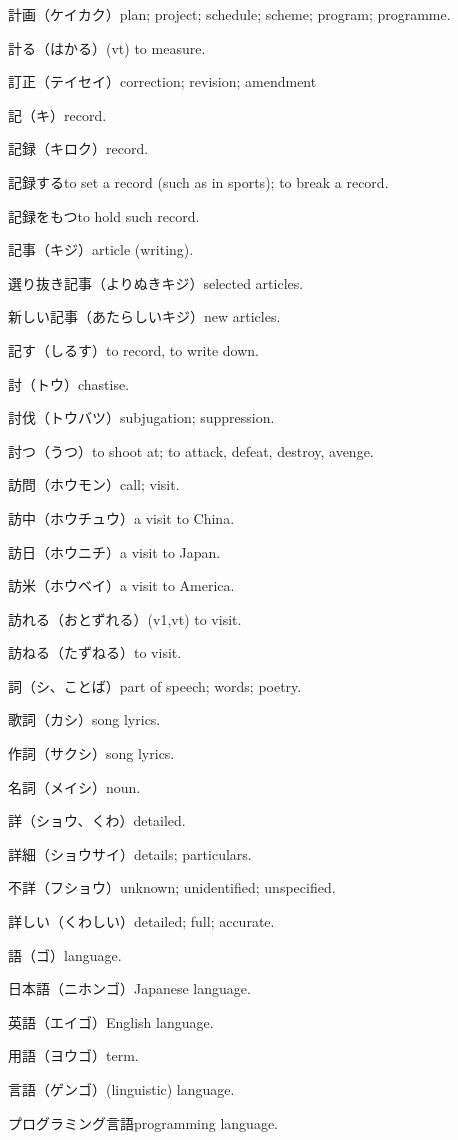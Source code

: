 計画（ケイカク）plan; project; schedule; scheme; program; programme.

計る（はかる）(vt) to measure.

訂正（テイセイ）correction; revision; amendment

記（キ）record.

記録（キロク）record.

記録するto set a record (such as in sports); to break a record.

記録をもつto hold such record.

記事（キジ）article (writing).

選り抜き記事（よりぬきキジ）selected articles.

新しい記事（あたらしいキジ）new articles.

記す（しるす）to record, to write down.

討（トウ）chastise.

討伐（トウバツ）subjugation; suppression.

討つ（うつ）to shoot at; to attack, defeat, destroy, avenge.

訪問（ホウモン）call; visit.

訪中（ホウチュウ）a visit to China.

訪日（ホウニチ）a visit to Japan.

訪米（ホウベイ）a visit to America.

訪れる（おとずれる）(v1,vt) to visit.

訪ねる（たずねる）to visit.

詞（シ、ことば）part of speech; words; poetry.

歌詞（カシ）song lyrics.

作詞（サクシ）song lyrics.

名詞（メイシ）noun.

詳（ショウ、くわ）detailed.

詳細（ショウサイ）details; particulars.

不詳（フショウ）unknown; unidentified; unspecified.

詳しい（くわしい）detailed; full; accurate.

語（ゴ）language.

日本語（ニホンゴ）Japanese language.

英語（エイゴ）English language.

用語（ヨウゴ）term.

言語（ゲンゴ）(linguistic) language.

プログラミング言語programming language.

